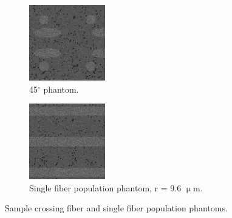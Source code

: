 \documentclass[11pt]{article}
\begin{document}
\begin{figure}[H]
  \centering
  \begin{subfigure}[t]{0.35\textwidth}
    \centering
    \includegraphics[width=0.9\linewidth]{figs/deg45}
    \caption{45$^{\circ}$ phantom.}
    \label{fig:deg45}
  \end{subfigure}
  \hspace{1em}
  \begin{subfigure}[t]{0.35\textwidth}
    \centering
    \includegraphics[width=0.9\linewidth]{figs/r8}
    \caption{Single fiber population phantom, r = 9.6 $\upmu$m.}
    \label{fig:r8}
  \end{subfigure}
  \caption{Sample crossing fiber and single fiber population phantoms.}
  \label{fig:phantoms}
\end{figure}
\end{document}
